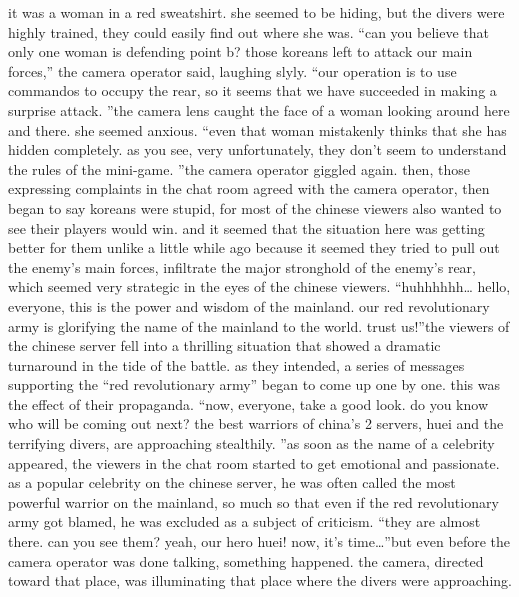 it was a woman in a red sweatshirt.
 she seemed to be hiding, but the divers were highly trained, they could easily find out where she was.
“can you believe that only one woman is defending point b? those koreans left to attack our main forces,” the camera operator said, laughing slyly.
“our operation is to use commandos to occupy the rear, so it seems that we have succeeded in making a surprise attack.
”the camera lens caught the face of a woman looking around here and there.
 she seemed anxious.
“even that woman mistakenly thinks that she has hidden completely.
 as you see, very unfortunately, they don’t seem to understand the rules of the mini-game.
”the camera operator giggled again.
then, those expressing complaints in the chat room agreed with the camera operator, then began to say koreans were stupid, for most of the chinese viewers also wanted to see their players would win.
and it seemed that the situation here was getting better for them unlike a little while ago because it seemed they tried to pull out the enemy’s main forces, infiltrate the major stronghold of the enemy’s rear, which seemed very strategic in the eyes of the chinese viewers.
“huhhhhhh… hello, everyone, this is the power and wisdom of the mainland.
 our red revolutionary army is glorifying the name of the mainland to the world.
 trust us!”the viewers of the chinese server fell into a thrilling situation that showed a dramatic turnaround in the tide of the battle.
as they intended, a series of messages supporting the “red revolutionary army” began to come up one by one.
 this was the effect of their propaganda.
“now, everyone, take a good look.
 do you know who will be coming out next? the best warriors of china’s 2 servers, huei and the terrifying divers, are approaching stealthily.
”as soon as the name of a celebrity appeared, the viewers in the chat room started to get emotional and passionate.
as a popular celebrity on the chinese server, he was often called the most powerful warrior on the mainland, so much so that even if the red revolutionary army got blamed, he was excluded as a subject of criticism.
“they are almost there.
 can you see them? yeah, our hero huei! now, it’s time…”but even before the camera operator was done talking, something happened.
 the camera, directed toward that place, was illuminating that place where the divers were approaching.

